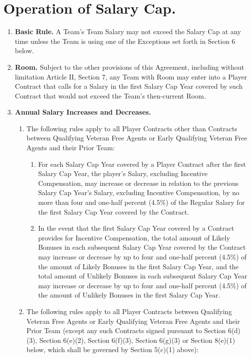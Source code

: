 \documentclass[
]{book}
\providecommand{\tightlist}{%
  \setlength{\itemsep}{0pt}\setlength{\parskip}{0pt}}
\begin{document}
\hypertarget{operation-of-salary-cap.}{%
\section{Operation of Salary Cap.}\label{operation-of-salary-cap.}}

\begin{enumerate}
\def\labelenumi{(\alph{enumi})}
\tightlist
\item
  \textbf{Basic Rule.} A Team's Team Salary may not exceed the Salary Cap at any time unless the Team is using one of the Exceptions set forth in Section 6 below.
\item
  \textbf{Room.} Subject to the other provisions of this Agreement, including without limitation Article II, Section 7, any Team with Room may enter into a Player Contract that calls for a Salary in the first Salary Cap Year covered by such Contract that would not exceed the Team's then-current Room.
\item
  \textbf{Annual Salary Increases and Decreases.}

  \begin{enumerate}
  \def\labelenumii{(\arabic{enumii})}
  \tightlist
  \item
    The following rules apply to all Player Contracts other than Contracts between Qualifying Veteran Free Agents or Early Qualifying Veteran Free Agents and their Prior Team:

    \begin{enumerate}
    \def\labelenumiii{(\roman{enumiii})}
    \tightlist
    \item
      For each Salary Cap Year covered by a Player Contract after the first Salary Cap Year, the player's Salary, excluding Incentive Compensation, may increase or decrease in relation to the previous Salary Cap Year's Salary, excluding Incentive Compensation, by no more than four and one-half percent (4.5\%) of the Regular Salary for the first Salary Cap Year covered by the Contract.
    \item
      In the event that the first Salary Cap Year covered by a Contract provides for Incentive Compensation, the total amount of Likely Bonuses in each subsequent Salary Cap Year covered by the Contract may increase or decrease by up to four and one-half percent (4.5\%) of the amount of Likely Bonuses in the first Salary Cap Year, and the total amount of Unlikely Bonuses in each subsequent Salary Cap Year may increase or decrease by up to four and one-half percent (4.5\%) of the amount of Unlikely Bonuses in the first Salary Cap Year.
    \end{enumerate}
  \item
    The following rules apply to all Player Contracts between Qualifying Veteran Free Agents or Early Qualifying Veteran Free Agents and their Prior Team (except any such Contracts signed pursuant to Section 6(d)(3), Section 6(e)(2), Section 6(f)(3), Section 6(g)(3) or Section 8(e)(1) below, which shall be governed by Section 5(c)(1) above):


\end{enumerate}
\end{enumerate}
\end{document}
